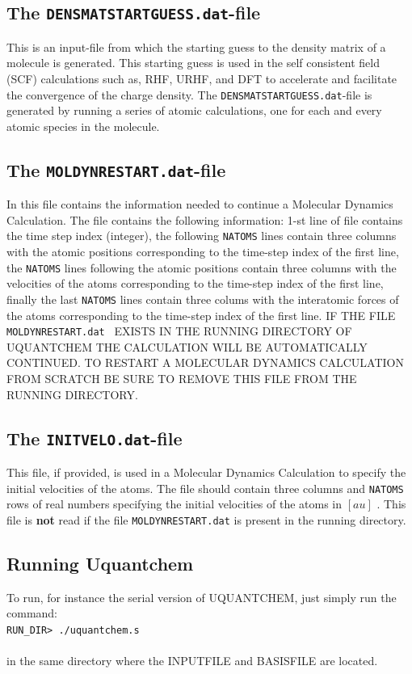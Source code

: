 \documentclass[a4paper,twoside,openany]{book}
\begin{document}
\subsection{The \texttt{DENSMATSTARTGUESS.dat}-file}
This is an input-file from which the starting guess to the density matrix of a molecule is generated. This starting guess is used in the self consistent field (SCF) calculations such as, RHF, URHF, and DFT to accelerate and facilitate the convergence of the charge density. The \texttt{DENSMATSTARTGUESS.dat}-file 
is generated by running a series of atomic calculations, one for each and every atomic species in the molecule.


\subsection{The \texttt{MOLDYNRESTART.dat}-file}
In this file contains the information needed to continue a Molecular Dynamics Calculation. The file contains the following information: 1-st line of file contains the time step index (integer), the following 
\texttt{NATOMS} lines contain three columns with the atomic positions corresponding to the time-step index of the first line, the \texttt{NATOMS} lines following the atomic positions contain three columns 
with the velocities of the atoms corresponding to the time-step index of the first line, finally the last \texttt{NATOMS} lines  contain three colums with the interatomic forces of the atoms corresponding to the time-step index of the first line.
IF THE FILE \texttt{MOLDYNRESTART.dat } EXISTS IN THE RUNNING DIRECTORY OF UQUANTCHEM THE CALCULATION WILL BE AUTOMATICALLY CONTINUED. TO RESTART A MOLECULAR 
DYNAMICS CALCULATION FROM SCRATCH BE SURE TO REMOVE THIS FILE FROM THE RUNNING DIRECTORY.

\subsection{The \texttt{INITVELO.dat}-file}
This file, if provided, is used in a Molecular Dynamics Calculation to specify the initial velocities of the atoms. The file should contain three columns and 
\texttt{NATOMS} rows of real numbers specifying the initial velocities of the atoms in $[au]$ . This file is {\bf not} read if the file \texttt{MOLDYNRESTART.dat} is present in the 
running directory.

\subsection{Running Uquantchem}
To run, for instance the serial version of UQUANTCHEM, just simply run the command: \\
\texttt{RUN\_DIR> ./uquantchem.s} \\ \\
in the same directory where the INPUTFILE and BASISFILE are located.
\end{document}
